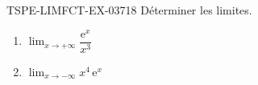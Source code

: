 \begin{exercice}{TSPE-LIMFCT-EX-037}{1}{8}
Déterminer les limites.
\begin{enumerate}
  \item $\lim_{x \to +\infty} \dfrac{\mathrm{e}^x}{x^3}$
  \item $\lim_{x \to -\infty} x^4\,\mathrm{e}^x$
\end{enumerate}
\end{exercice}
